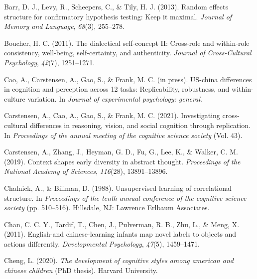 \documentclass[10pt, letterpaper]{article}
\newenvironment{CSLReferences}%
  {}%
  {\par}
\begin{document}
\hypertarget{refs}{}
\begin{CSLReferences}{1}{0}
\leavevmode{}%
Barr, D. J., Levy, R., Scheepers, C., \& Tily, H. J. (2013). Random
effects structure for confirmatory hypothesis testing: Keep it maximal.
\emph{Journal of Memory and Language}, \emph{68}(3), 255--278.

\leavevmode{}%
Boucher, H. C. (2011). The dialectical self-concept II: Cross-role and
within-role consistency, well-being, self-certainty, and authenticity.
\emph{Journal of Cross-Cultural Psychology}, \emph{42}(7), 1251--1271.

\leavevmode{}%
Cao, A., Carstensen, A., Gao, S., \& Frank, M. C. (in press). US-china
differences in cognition and perception across 12 tasks: Replicability,
robustness, and within-culture variation. In \emph{Journal of
experimental psychology: general}.

\leavevmode{}%
Carstensen, A., Cao, A., Gao, S., \& Frank, M. C. (2021). Investigating
cross-cultural differences in reasoning, vision, and social cognition
through replication. In \emph{Proceedings of the annual meeting of the
cognitive science society} (Vol. 43).

\leavevmode{}%
Carstensen, A., Zhang, J., Heyman, G. D., Fu, G., Lee, K., \& Walker, C.
M. (2019). Context shapes early diversity in abstract thought.
\emph{Proceedings of the National Academy of Sciences}, \emph{116}(28),
13891--13896.

\leavevmode{}%
Chalnick, A., \& Billman, D. (1988). Unsupervised learning of
correlational structure. In \emph{Proceedings of the tenth annual
conference of the cognitive science society} (pp. 510--516). Hillsdale,
NJ: Lawrence Erlbaum Associates.

\leavevmode{}%
Chan, C. C. Y., Tardif, T., Chen, J., Pulverman, R. B., Zhu, L., \&
Meng, X. (2011). English-and chinese-learning infants map novel labels
to objects and actions differently. \emph{Developmental Psychology},
\emph{47}(5), 1459--1471.

\leavevmode{}%
Cheng, L. (2020). \emph{The development of cognitive styles among
american and chinese children} (PhD thesis). Harvard University.


\end{CSLReferences}
\end{document}
